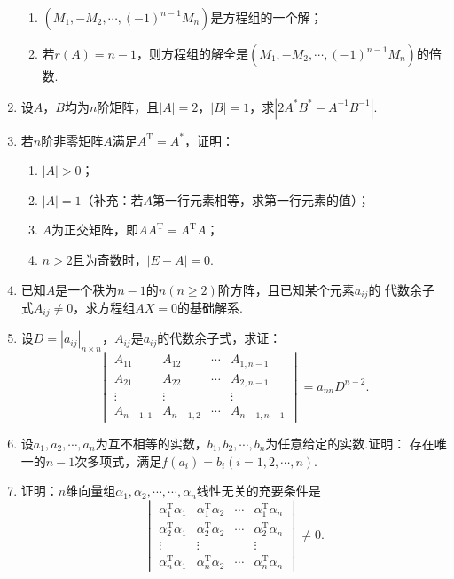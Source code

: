 \begin{enumerate}
\begin{enumerate}[label=(\arabic*)]
        \item $(M_1,-M_2,\cdots,(-1)^{n-1}M_n)$是方程组的一个解；
        \item 若$r(A)=n-1$，则方程组的解全是$(M_1,-M_2,\cdots,(-1)^{n-1}M_n)$的倍数.
    \end{enumerate}
    \item 设$A$，$B$均为$n$阶矩阵，且$|A|=2$，$|B|=1$，求$|2A^*B^*-A^{-1}B^{-1}|$.
	\item 若$n$阶非零矩阵$A$满足$A^\mathrm{T}=A^*$，证明：
	\begin{enumerate}[label=(\arabic*)]
        \item $|A|>0$；
        \item $|A|=1$（补充：若$A$第一行元素相等，求第一行元素的值）；
        \item $A$为正交矩阵，即$AA^\mathrm{T}=A^\mathrm{T}A$；
        \item $n>2$且为奇数时，$|E-A|=0$.
    \end{enumerate}
	\item 已知$A$是一个秩为$n-1$的$n(n \ge 2)$阶方阵，且已知某个元素$a_{ij}$的
	代数余子式$A_{ij} \neq 0$，求方程组$AX=0$的基础解系.
	\item 设$D=|a_{ij}|_{n \times n}$，$A_{ij}$是$a_{ij}$的代数余子式，求证：
	\[\begin{vmatrix}
		A_{11} & A_{12} & \cdots & A_{1,n-1} \\
		A_{21} & A_{22} & \cdots & A_{2,n-1} \\
		\vdots & \vdots &  & \vdots \\
		A_{n-1,1} & A_{n-1,2} & \cdots & A_{n-1,n-1}
	\end{vmatrix}=a_{nn}D^{n-2}.\]
    \item 设$a_1,a_2,\cdots,a_n$为互不相等的实数，$b_1,b_2,\cdots,b_n$为任意给定的实数.证明：
	存在唯一的$n-1$次多项式，满足$f(a_i)=b_i(i=1,2,\cdots,n)$.
    \item 证明：$n$维向量组$\alpha_1,\alpha_2,\cdots,\cdots,\alpha_n$线性无关的充要条件是
    \[\begin{vmatrix}
		\alpha_1^\mathrm{T}\alpha_1 & \alpha_1^\mathrm{T}\alpha_2 & \cdots & \alpha_1^\mathrm{T}\alpha_n \\
		\alpha_2^\mathrm{T}\alpha_1 & \alpha_2^\mathrm{T}\alpha_2 & \cdots & \alpha_2^\mathrm{T}\alpha_n \\
		\vdots & \vdots &  & \vdots \\
		\alpha_n^\mathrm{T}\alpha_1 & \alpha_n^\mathrm{T}\alpha_2 & \cdots & \alpha_n^\mathrm{T}\alpha_n
	\end{vmatrix}\neq 0.\]

\end{enumerate}
